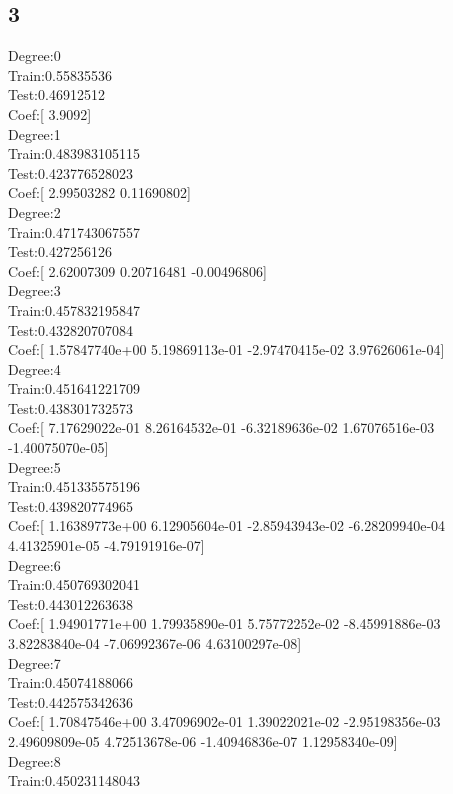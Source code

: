 \documentclass [11pt, a4paper, oneside] {article}
\begin{document}
\subsection *{3}
Degree:0\\
Train:0.55835536\\
Test:0.46912512\\
Coef:[ 3.9092]\\
Degree:1\\
Train:0.483983105115\\
Test:0.423776528023\\
Coef:[ 2.99503282  0.11690802]\\
Degree:2\\
Train:0.471743067557\\
Test:0.427256126\\
Coef:[ 2.62007309  0.20716481 -0.00496806]\\
Degree:3\\
Train:0.457832195847\\
Test:0.432820707084\\
Coef:[  1.57847740e+00   5.19869113e-01  -2.97470415e-02   3.97626061e-04]\\
Degree:4\\
Train:0.451641221709\\
Test:0.438301732573\\
Coef:[  7.17629022e-01   8.26164532e-01  -6.32189636e-02   1.67076516e-03
  -1.40075070e-05]\\
Degree:5\\
Train:0.451335575196\\
Test:0.439820774965\\
Coef:[  1.16389773e+00   6.12905604e-01  -2.85943943e-02  -6.28209940e-04
   4.41325901e-05  -4.79191916e-07]\\
Degree:6\\
Train:0.450769302041\\
Test:0.443012263638\\
Coef:[  1.94901771e+00   1.79935890e-01   5.75772252e-02  -8.45991886e-03
   3.82283840e-04  -7.06992367e-06   4.63100297e-08]\\
Degree:7\\
Train:0.45074188066\\
Test:0.442575342636\\
Coef:[  1.70847546e+00   3.47096902e-01   1.39022021e-02  -2.95198356e-03
   2.49609809e-05   4.72513678e-06  -1.40946836e-07   1.12958340e-09]\\
Degree:8\\
Train:0.450231148043\\
\end{document}
